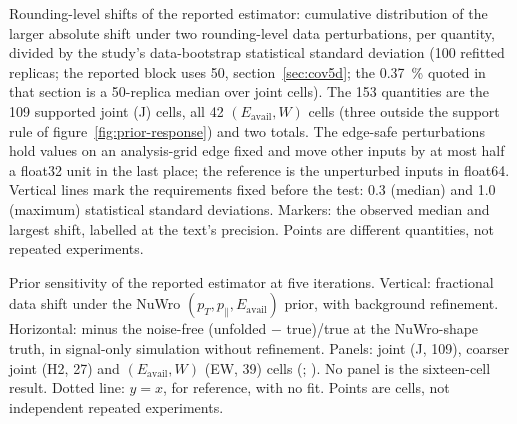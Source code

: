 \caption{Rounding-level shifts of the reported estimator: cumulative distribution of the larger absolute shift under two rounding-level data perturbations, per quantity, divided by the study's data-bootstrap statistical standard deviation (100 refitted replicas; the reported block uses 50, section~\ref{sec:cov5d}; the \SI{0.37}{\percent} quoted in that section is a 50-replica median over joint cells). The 153 quantities are the 109 supported joint (J) cells, all 42 $(E_{\mathrm{avail}},W)$ cells (three outside the support rule of figure~\ref{fig:prior-response}) and two totals. The edge-safe perturbations hold values on an analysis-grid edge fixed and move other inputs by at most half a float32 unit in the last place; the reference is the unperturbed inputs in float64. Vertical lines mark the requirements fixed before the test: 0.3 (median) and 1.0 (maximum) statistical standard deviations. Markers: the observed median and largest shift, labelled at the text's precision. Points are different quantities, not repeated experiments.}

\caption{Prior sensitivity of the reported estimator at five iterations. Vertical: fractional data shift under the NuWro $(p_T,p_\parallel,E_{\mathrm{avail}})$ prior, with background refinement. Horizontal: minus the noise-free (unfolded $-$ true)/true at the NuWro-shape truth, in signal-only simulation without refinement. Panels: joint (J, 109), coarser joint (H2, 27) and $(E_{\mathrm{avail}},W)$ (EW, 39) cells (; ). No panel is the sixteen-cell result. Dotted line: $y=x$, for reference, with no fit. Points are cells, not independent repeated experiments.}
